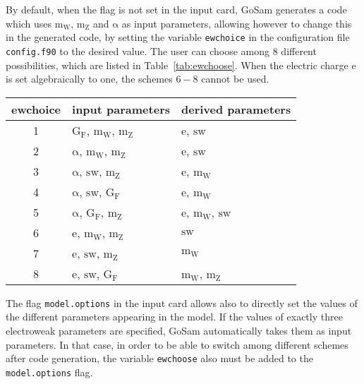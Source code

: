 \documentclass[11pt,a4paper]{refrep}
\newcommand{\gosam}{{\sc GoSam}\xspace}
\newcommand{\mrm}[1]{\mathrm{#1}}
\begin{document}
By default, when the flag is not set in the input card, \gosam{}
generates a code which uses $\mrm{m_W}$, $\mrm{m_Z}$ and
$\mrm{\alpha}$ as input parameters, allowing however to change this in
the generated code, by setting the variable {\tt ewchoice} in the
configuration file {\tt config.f90} to the desired value. The user can
choose among 8 different possibilities, which are listed in
Table~\ref{tab:ewchoose}.  When the electric charge $\mrm{e}$ is set
algebraically to one, the schemes $6-8$ cannot be used.

\begin{table*}
\begin{center}
\small
\begin{tabular}{|c|l|l|}
\hline
ewchoice & input parameters                        & derived parameters                  \\
\hline
1        & $\mrm{G_F}$, $\mrm{m_W}$, $\mrm{m_Z}$    & $\mrm{e}$, $\mrm{sw}$              \\
2        & $\mrm{\alpha}$, $\mrm{m_W}$, $\mrm{m_Z}$ & $\mrm{e}$, $\mrm{sw}$              \\
3        & $\mrm{\alpha}$, $\mrm{sw}$, $\mrm{m_Z}$  & $\mrm{e}$, $\mrm{m_W}$             \\
4        & $\mrm{\alpha}$, $\mrm{sw}$, $\mrm{G_F}$  & $\mrm{e}$, $\mrm{m_W}$             \\
5        & $\mrm{\alpha}$, $\mrm{G_F}$, $\mrm{m_Z}$ & $\mrm{e}$, $\mrm{m_W}$, $\mrm{sw}$ \\
6        & $\mrm{e}$, $\mrm{m_W}$, $\mrm{m_Z}$      & $\mrm{sw}$                         \\
7        & $\mrm{e}$, $\mrm{sw}$, $\mrm{m_Z}$       & $\mrm{m_W}$                        \\
8        & $\mrm{e}$, $\mrm{sw}$, $\mrm{G_F}$       & $\mrm{m_W}$, $\mrm{m_Z}$           \\
\hline
\end{tabular}
\end{center}
\caption{Possible choices to select the electroweak scheme.
To simplify the notation we write the sine of the Weinberg angle as
$\mrm{sw}$. The lists of derived parameters contain only the
parameters which are computed and used in the expressions for the
amplitudes.}\label{tab:ewchoose}
\end{table*}


The flag {\tt model.options} in the input card allows also to directly
set the values of the different parameters appearing in the model. If
the values of exactly three electroweak parameters are
specified, \gosam{} automatically takes them as input parameters. In
that case, in order to be able to switch among different schemes after
code generation, the variable {\tt ewchoose} also must be added to the
{\tt model.options} flag.
\end{document}
